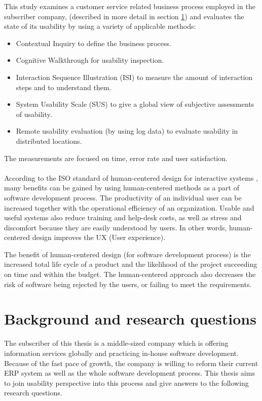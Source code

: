 \documentclass[12pt,a4paper,oneside,pdftex]{report}
\begin{document}
This study examines a customer service related business process employed in the subscriber company, (described in more detail in section \ref{sec:background}) and evaluates the state of its usability by using a variety of applicable methods:
\begin{itemize}
\item Contextual Inquiry to define the business process.
\item Cognitive Walkthrough for usability inspection.
\item Interaction Sequence Illustration (ISI) to measure the amount of interaction steps and to understand them.
\item System Usability Scale (SUS) to give a global view of subjective assessments of usability.
\item Remote usability evaluation (by using log data) to evaluate usability in distributed locations.
\end{itemize}
The measurements are focused on time, error rate and user satisfaction.
\\
\\
\indent According to the ISO standard of human-centered design for interactive systems \cite{RefWorks:16}, many benefits can be gained by using human-centered methods as a part of software development process. The productivity of an individual user can be increased together with the operational efficiency of an organization. Usable and useful systems also reduce training and help-desk costs, as well as stress and discomfort because they are easily understood by users. In other words, human-centered design improves the UX (User experience).

The benefit of human-centered design (for software development process) is the increased total life cycle of a product and the likelihood of the project succeeding on time and within the budget. The human-centered approach also decreases the risk of software being rejected by the users, or failing to meet the requirements. \cite{RefWorks:16}

\section{Background and research questions}
\label{sec:background}
The subscriber of this thesis is a middle-sized company which is offering information services globally and practicing in-house software development. Because of the fast pace of growth, the company is willing to reform their current ERP system as well as the whole software development process. This thesis aims to join usability perspective into this process and give answers to the following research questions.
\end{document}
